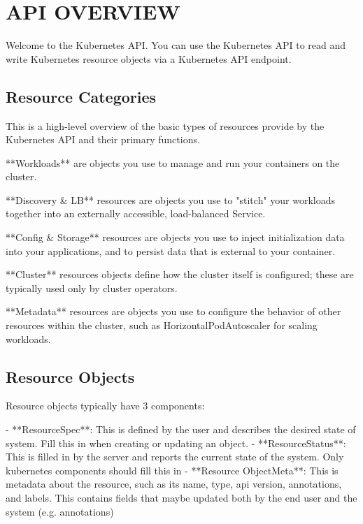\section{API OVERVIEW}

Welcome to the Kubernetes API.  You can use the Kubernetes API to read
and write Kubernetes resource objects via a Kubernetes API endpoint.

\subsection{Resource Categories}

This is a high-level overview of the basic types of resources provide by the Kubernetes API and their primary functions.

\begin{itemize}
**Workloads** are objects you use to manage and run your containers on the cluster.

**Discovery & LB** resources are objects you use to "stitch" your workloads together into an externally accessible, load-balanced Service.

**Config & Storage** resources are objects you use to inject initialization data into your applications, and to persist data that is external to your container.

**Cluster** resources objects define how the cluster itself is configured; these are typically used only by cluster operators.

**Metadata** resources are objects you use to configure the behavior of other resources within the cluster, such as HorizontalPodAutoscaler for scaling workloads.
\end{itemize}


\subsection{Resource Objects}

Resource objects typically have 3 components:

\begin{itemize}
- **ResourceSpec**: This is defined by the user and describes the desired state of system.  Fill this in when creating or updating an
object.
- **ResourceStatus**: This is filled in by the server and reports the current state of the system.  Only kubernetes components should fill
this in
- **Resource ObjectMeta**: This is metadata about the resource, such as its name, type, api version, annotations, and labels.  This contains
fields that maybe updated both by the end user and the system (e.g. annotations)
\end{itemize}


